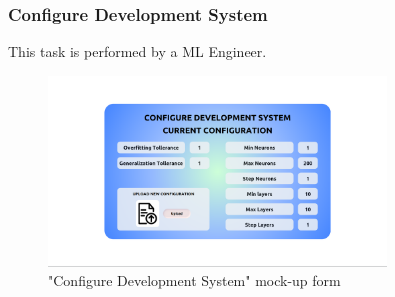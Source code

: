 \subsubsection{Configure Development System}

This task is performed by a ML Engineer.

\begin{figure}[H]
\centering
\includegraphics[width=0.8\textwidth]{figures/ui_configure_development.png}
\caption{"Configure Development System" mock-up form}
\end{figure}

